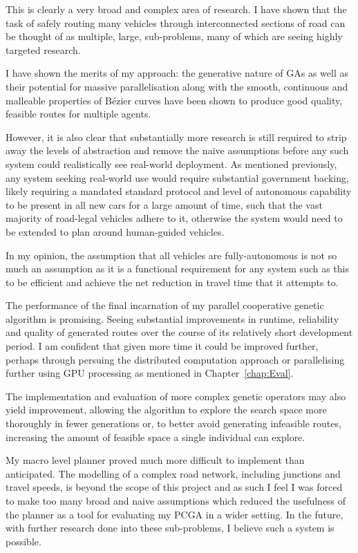 
This is clearly a very broad and complex area of research. I have shown that the task of safely routing many vehicles through interconnected sections of road can be thought of as multiple, large, sub-problems, many of which are seeing highly targeted research.

I have shown the merits of my approach: the generative nature of GAs as well as their potential for massive parallelisation along with the smooth, continuous and malleable properties of Bézier curves have been shown to produce good quality, feasible routes for multiple agents.

However, it is also clear that substantially more research is still required to strip away the levels of abstraction and remove the naive assumptions before any such system could realistically see real-world deployment. As mentioned previously, any system seeking real-world use would require substantial government backing, likely requiring a mandated standard protocol and level of autonomous capability to be present in all new cars for a large amount of time, such that the vast majority of road-legal vehicles adhere to it, otherwise the system would need to be extended to plan around human-guided vehicles.

In my opinion, the assumption that all vehicles are fully-autonomous is not so much an assumption as it is a functional requirement for any system such as this to be efficient and achieve the net reduction in travel time that it attempts to.

The performance of the final incarnation of my parallel cooperative genetic algorithm is promising. Seeing substantial improvements in runtime, reliability and quality of generated routes over the course of its relatively short development period. I am confident that given more time it could be improved further, perhaps through persuing the distributed computation approach or parallelising further using GPU processing as mentioned in Chapter~\ref{chap:Eval}.

The implementation and evaluation of more complex genetic operators may also yield improvement, allowing the algorithm to explore the search space more thoroughly in fewer generations or, to better avoid generating infeasible routes, increasing the amount of feasible space a single individual can explore.

My macro level planner proved much more difficult to implement than anticipated. The modelling of a complex road network, including junctions and travel speeds, is beyond the scope of this project and as such I feel I was forced to make too many broad and naive assumptions which reduced the usefulness of the planner as a tool for evaluating my PCGA in a wider setting. In the future, with further research done into these sub-problems, I believe such a system is possible.

